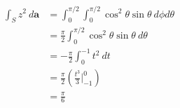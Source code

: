 \documentclass[10pt]{mypackage}
\begin{document}
\begin{enumerate}[(a)]
\begin{align*}
      \int_{S}^{} z^2\:d\mathbf{a} &= \int_{0}^{\pi/2}\int_{0}^{\pi/2} \cos^2\theta \sin\theta\:d\phi d\theta\\
                                   &= \frac{\pi}{2}\int_{0}^{\pi/2} \cos^2\theta\sin\theta\:d\theta\\
                                   &= -\frac{\pi}{2}\int_{0}^{-1} t^2\:dt \tag*{$t = \cos\theta$}\\
                                   &= \frac{\pi}{2}\left(\frac{t^3}{3}\bigr\vert_{-1}^{0}\right)\\
                                   &= \frac{\pi}{6}
    \end{align*}
\end{enumerate}
\end{document}
